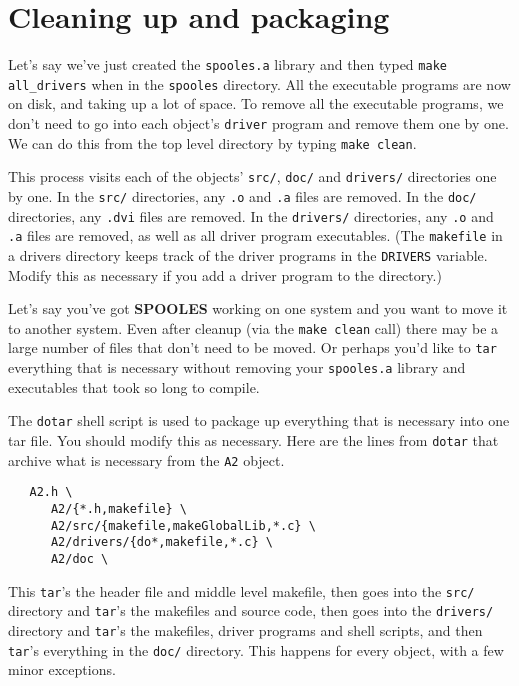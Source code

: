 \par
\section{Cleaning up and packaging}
\label{section:cleanup}
\par
Let's say we've just created the {\tt spooles.a} library and then
typed {\tt make all\_drivers} when in the {\tt spooles} directory.
All the executable programs are now on disk, 
and taking up a lot of space.
To remove all the executable programs, we don't need to go into
each object's {\tt driver} program and remove them one by one.
We can do this from the top level directory by typing
{\tt make clean}.
\par
This process visits each of the objects' {\tt src/}, {\tt doc/} and
{\tt drivers/} directories one by one.
In the {\tt src/} directories, any {\tt *.o} and {\tt *.a} files
are removed.
In the {\tt doc/} directories, any {\tt *.dvi} files are removed.
In the {\tt drivers/} directories, any {\tt *.o} and {\tt *.a} files 
are removed, as well as all driver program executables.
(The {\tt makefile} in a drivers directory keeps track of the
driver programs in the {\tt DRIVERS} variable.
Modify this as necessary if you add a driver program to the
directory.)
\par
Let's say you've got {\bf SPOOLES} working on one system and you
want to move it to another system.
Even after cleanup (via the {\tt make clean} call) there may be a
large number of files that don't need to be moved.
Or perhaps you'd like to {\tt tar} everything that is necessary without
removing your {\tt spooles.a} library and executables that took so
long to compile.
\par
The {\tt dotar} shell script is used to package up everything that
is necessary into one tar file.
You should modify this as necessary.
Here are the lines from {\tt dotar} that archive what is necessary
from the {\tt A2} object.
\begin{verbatim}
   A2.h \
      A2/{*.h,makefile} \
      A2/src/{makefile,makeGlobalLib,*.c} \
      A2/drivers/{do*,makefile,*.c} \
      A2/doc \
\end{verbatim}
This {\tt tar}'s the header file and middle level makefile,
then goes into the {\tt src/} directory and {\tt tar}'s the makefiles
and source code,
then goes into the {\tt drivers/} directory 
and {\tt tar}'s the makefiles, driver programs and shell scripts,
and then {\tt tar}'s everything in the {\tt doc/} directory.
This happens for every object, with a few minor exceptions.
\par

